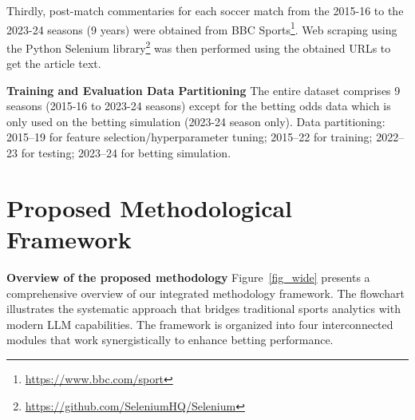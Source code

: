 \documentclass[conference]{IEEEtran}
\begin{document}
Thirdly, post-match commentaries for each soccer match from the 2015-16 to the 2023-24 seasons 
(9 years) were obtained from BBC Sports\footnote{\url{https://www.bbc.com/sport}}. 
Web scraping using the Python Selenium 
library\footnote{\url{https://github.com/SeleniumHQ/Selenium}} was then performed using the obtained URLs to get the article text.

\noindent\textbf{Training and Evaluation Data Partitioning}
The entire dataset comprises 9 seasons (2015-16 to 2023-24 seasons) except for the betting odds data which is only used on the betting simulation (2023-24 season only). Data partitioning: 2015–19 for feature selection/hyperparameter tuning; 2015–22 for training; 2022–23 for testing; 2023–24 for betting simulation.


\section{Proposed Methodological Framework}

\noindent\textbf{Overview of the proposed methodology}
Figure~\ref{fig_wide} presents a comprehensive overview of our integrated methodology framework. The flowchart illustrates the systematic approach that bridges traditional sports analytics with modern LLM capabilities. The framework is organized into four interconnected modules that work synergistically to enhance betting performance. 
\end{document}
